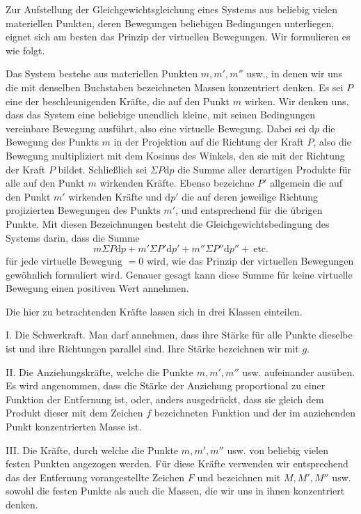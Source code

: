 Zur Aufstellung der Gleichgewichtsgleichung eines Systems aus beliebig vielen materiellen Punkten, deren Bewegungen beliebigen Bedingungen unterliegen, eignet sich am besten das Prinzip der virtuellen Bewegungen. Wir formulieren es wie folgt.

Das System bestehe aus materiellen Punkten $m,m',m''$ usw., in denen wir uns die mit denselben Buchstaben bezeichneten Massen konzentriert denken. Es sei $P$ eine der beschleunigenden Kräfte, die auf den Punkt $m$ wirken. Wir denken uns, dass das System eine beliebige unendlich kleine, mit seinen Bedingungen vereinbare Bewegung ausführt, also eine virtuelle Bewegung. Dabei sei $\mathrm{d}p$ die Bewegung des Punkts $m$ in der Projektion auf die Richtung der Kraft $P$, also die Bewegung multipliziert mit dem Kosinus des Winkels, den sie mit der Richtung der Kraft $P$ bildet. Schließlich sei $\Sigma P\mathrm{d}p$ die Summe aller derartigen Produkte für alle auf den Punkt $m$ wirkenden Kräfte. Ebenso bezeichne $P'$ allgemein die auf den Punkt $m'$ wirkenden Kräfte und $\mathrm{d}p'$ die auf deren jeweilige Richtung projizierten Bewegungen des Punkts $m'$, und entsprechend für die übrigen Punkte. Mit diesen Bezeichnungen besteht die Gleichgewichtsbedingung des Systems darin, dass die Summe
\[
m\Sigma P\mathrm{d}p+m'\Sigma P'\mathrm{d}p'+m''\Sigma P''\mathrm{d}p''+\ \text{etc.}
\]
für jede virtuelle Bewegung $=0$ wird, wie das Prinzip der virtuellen Bewegungen gewöhnlich formuliert wird. Genauer gesagt kann diese Summe für keine virtuelle Bewegung einen positiven Wert annehmen.

Die hier zu betrachtenden Kräfte lassen sich in drei Klassen einteilen.

I. Die Schwerkraft. Man darf annehmen, dass ihre Stärke für alle Punkte dieselbe ist und ihre Richtungen parallel sind. Ihre Stärke bezeichnen wir mit $g$.

II. Die Anziehungskräfte, welche die Punkte $m,m',m''$ usw. aufeinander ausüben. Es wird angenommen, dass die Stärke der Anziehung proportional zu einer Funktion der Entfernung ist, oder, anders ausgedrückt, dass sie gleich dem Produkt dieser mit dem Zeichen $f$ bezeichneten Funktion und der im anziehenden Punkt konzentrierten Masse ist.

III. Die Kräfte, durch welche die Punkte $m,m',m''$ usw. von beliebig vielen festen Punkten angezogen werden. Für diese Kräfte verwenden wir entsprechend das der Entfernung vorangestellte Zeichen $F$ und bezeichnen mit $M,M',M''$ usw. sowohl die festen Punkte als auch die Massen, die wir uns in ihnen konzentriert denken.

